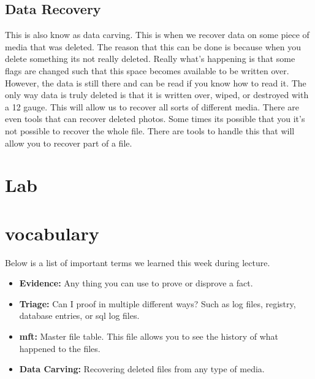 \documentclass[letterpaper, onecolumn,10pt]{IEEEtran}
\begin{document}
            \subsection{Data Recovery} This is also know as data carving. This is when we recover data on some piece of media that was deleted. The reason that this can be done is because when you delete something its not really deleted. Really what's happening is that some flags are changed such that this space becomes available to be written over. However, the data is still there and can be read if you know how to read it. The only way data is truly deleted is that it is written over, wiped, or destroyed with a 12 gauge. This will allow us to recover all sorts of different media. There are even tools that can recover deleted photos. Some times its possible that you it's not possible to recover the whole file. There are tools to handle this that will allow you to recover part of a file.\\
		
		\section{Lab}

		\section{vocabulary}
		    Below is a list of important terms we learned this week during lecture.\\
		    \begin{itemize}
		        \item \textbf{Evidence: } Any thing you can use to prove or disprove a fact.\\
		        \item \textbf{Triage: } Can I proof in multiple different ways? Such as log files, registry, database entries, or sql log files.\\
		        \item \textbf{mft: } Master file table. This file allows you to see the history of what happened to the files.\\
		        \item \textbf{Data Carving: } Recovering deleted files from any type of media.\\
		    \end{itemize}
		
\end{document}
